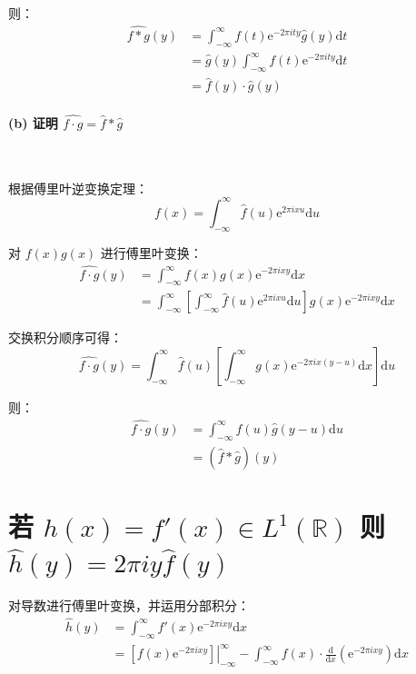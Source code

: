 \documentclass{article}
\newcommand{\eval}[2]{\left.#1\right|_{#2}}
\newcommand{\e}{\mathrm{e}}
\renewcommand{\d}{\mathrm{d}}
\begin{document}
则：
\begin{align*}
    \widehat{f * g}(y) &= \int_{-\infty}^{\infty} f(t)\e^{-2\pi i ty} \hat{g}(y) \d t
    \\
    &= \hat{g}(y) \int_{-\infty}^{\infty} f(t)\e^{-2\pi i ty} \d t
    \\
    &= \hat{f}(y) \cdot \hat{g}(y)
\end{align*}



\paragraph*{(b) 证明 $\widehat{f \cdot g} = \hat{f} * \hat{g}$}~{\\[-7pt]}

根据傅里叶逆变换定理：
\[ f(x) = \int_{-\infty}^{\infty} \hat{f}(u)\e^{2\pi i xu} \d u \]

对 $f(x)g(x)$ 进行傅里叶变换：
\begin{align*}
    \widehat{f \cdot g}(y) &= \int_{-\infty}^{\infty} f(x)g(x)\e^{-2\pi i xy} \d x
    \\
    &= \int_{-\infty}^{\infty} \left[ \int_{-\infty}^{\infty} \hat{f}(u)\e^{2\pi i xu} \d u \right] g(x)\e^{-2\pi i xy} \d x
\end{align*}

交换积分顺序可得：
\[ \widehat{f \cdot g}(y) = \int_{-\infty}^{\infty} \hat{f}(u) \left[ \int_{-\infty}^{\infty} g(x)\e^{-2\pi i x(y-u)} \d x \right] \d u \]

则：
\begin{align*}
    \widehat{f \cdot g}(y) &= \int_{-\infty}^{\infty} \hat{f}(u) \hat{g}(y-u) \d u
    \\
    &= (\hat{f} * \hat{g})(y)
\end{align*}



\section{若 $h(x) = f'(x) \in L^1(\mathbb{R})$ 则 $\hat{h}(y) = 2\pi iy\hat{f}(y)$}
对导数进行傅里叶变换，并运用分部积分：
\begin{align*}
    \hat{h}(y) &= \int_{-\infty}^{\infty} f'(x)\e^{-2\pi i xy} \d x
    \\
    &= \eval{\left[ f(x)\e^{-2\pi i xy} \right]}{-\infty}^{\infty} - \int_{-\infty}^{\infty} f(x) \cdot \frac{\d}{\d x}\left( \e^{-2\pi i xy} \right) \d x
\end{align*}
\end{document}
